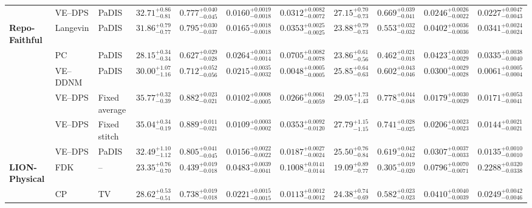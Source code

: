\begin{landscape}
\begin{table}[p]
{\begin{tabular}{lllcccccccc}
 & VE--DPS & PaDIS & $32.71^{+0.86}_{-0.81}$ & $0.777^{+0.040}_{-0.045}$ & $0.0160^{+0.0019}_{-0.0018}$ & $0.0312^{+0.0082}_{-0.0072}$ & $27.15^{+0.70}_{-0.73}$ & $0.669^{+0.039}_{-0.041}$ & $0.0246^{+0.0026}_{-0.0022}$ & $0.0227^{+0.0047}_{-0.0043}$ \\
\addlinespace[2pt]\midrule
\textbf{Repo-Faithful} & Langevin & PaDIS & $31.86^{+0.79}_{-0.77}$ & $0.795^{+0.030}_{-0.037}$ & $0.0165^{+0.0018}_{-0.0018}$ & $0.0353^{+0.0025}_{-0.0025}$ & $23.88^{+0.79}_{-0.73}$ & $0.553^{+0.032}_{-0.032}$ & $0.0402^{+0.0036}_{-0.0036}$ & $0.0341^{+0.0024}_{-0.0024}$ \\
 & PC & PaDIS & $28.15^{+0.34}_{-0.34}$ & $0.627^{+0.029}_{-0.028}$ & $0.0264^{+0.0013}_{-0.0014}$ & $0.0705^{+0.0082}_{-0.0078}$ & $23.86^{+0.61}_{-0.56}$ & $0.462^{+0.021}_{-0.018}$ & $0.0423^{+0.0030}_{-0.0029}$ & $0.0335^{+0.0038}_{-0.0040}$ \\
 & VE--DDNM & PaDIS & $30.00^{+1.07}_{-1.16}$ & $0.712^{+0.052}_{-0.056}$ & $0.0215^{+0.0035}_{-0.0032}$ & $0.0048^{+0.0005}_{-0.0005}$ & $25.85^{+0.64}_{-0.63}$ & $0.602^{+0.043}_{-0.046}$ & $0.0300^{+0.0029}_{-0.0028}$ & $0.0061^{+0.0005}_{-0.0004}$ \\
 & VE--DPS & Fixed average & $35.77^{+0.32}_{-0.39}$ & $0.882^{+0.023}_{-0.021}$ & $0.0102^{+0.0008}_{-0.0005}$ & $0.0266^{+0.0061}_{-0.0059}$ & $29.05^{+1.73}_{-1.43}$ & $0.778^{+0.044}_{-0.048}$ & $0.0179^{+0.0030}_{-0.0029}$ & $0.0171^{+0.0053}_{-0.0041}$ \\
 & VE--DPS & Fixed stitch & $35.04^{+0.34}_{-0.19}$ & $0.889^{+0.011}_{-0.021}$ & $0.0109^{+0.0003}_{-0.0002}$ & $0.0353^{+0.0092}_{-0.0120}$ & $27.79^{+1.15}_{-1.15}$ & $0.741^{+0.028}_{-0.025}$ & $0.0206^{+0.0023}_{-0.0023}$ & $0.0144^{+0.0021}_{-0.0021}$ \\
 & VE--DPS & PaDIS & $32.49^{+1.10}_{-1.12}$ & $0.805^{+0.041}_{-0.045}$ & $0.0156^{+0.0022}_{-0.0022}$ & $0.0187^{+0.0027}_{-0.0024}$ & $25.50^{+0.76}_{-0.84}$ & $0.619^{+0.042}_{-0.042}$ & $0.0307^{+0.0037}_{-0.0033}$ & $0.0135^{+0.0010}_{-0.0010}$ \\
\addlinespace[2pt]\midrule
\textbf{LION-Physical} & FDK & -- & $23.35^{+0.76}_{-0.70}$ & $0.439^{+0.019}_{-0.018}$ & $0.0483^{+0.0039}_{-0.0041}$ & $0.1008^{+0.0141}_{-0.0144}$ & $19.09^{+0.89}_{-0.77}$ & $0.305^{+0.019}_{-0.020}$ & $0.0796^{+0.0070}_{-0.0071}$ & $0.2288^{+0.0320}_{-0.0338}$ \\
 & CP & TV & $28.62^{+0.53}_{-0.51}$ & $0.738^{+0.019}_{-0.018}$ & $0.0221^{+0.0015}_{-0.0015}$ & $0.0113^{+0.0012}_{-0.0012}$ & $24.38^{+0.74}_{-0.69}$ & $0.582^{+0.023}_{-0.023}$ & $0.0410^{+0.0040}_{-0.0039}$ & $0.0249^{+0.0042}_{-0.0046}$ \\

\end{tabular}}
\end{table}
\end{landscape}
